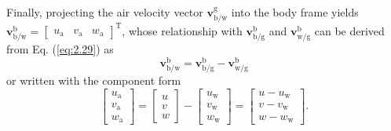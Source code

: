 Finally, projecting the air velocity vector $\mathbf{v}_{\text{{b}/{w}}}^{\text{g}}$
into the body frame yields $\mathbf{v}_{\text{{b}/{w}}}^{\text{b}}=\left[\begin{array}{ccc}
{u}_{\text{a}} & {v}_{\text{a}} & {w}_{\text{a}}\end{array}\right]^{\text{T}}$, whose relationship with $\mathbf{v}_{\text{{b}/{g}}}^{\text{b}}$
and $\mathbf{v}_{\text{{w}/{g}}}^{\text{b}}$ can be derived from
Eq. (\ref{eq:2.29}) as 
\begin{equation}
\mathbf{v}_{\text{{b}/{w}}}^{\text{b}}=\mathbf{v}_{\text{{b}/{g}}}^{\text{b}}-\mathbf{v}_{\text{{w}/{g}}}^{\text{b}}\label{eq:2.32}
\end{equation}
or written with the component form 
\begin{equation}
\left[{\begin{array}{c}
	{u_{\text{a}}}\\
	{v_{\text{a}}}\\
	{w_{\text{a}}}
	\end{array}}\right]=\left[\begin{array}{c}
u\\
v\\
w
\end{array}\right]-\left[{\begin{array}{c}
	{u_{\text{w}}}\\
	{v_{\text{w}}}\\
	{w_{\text{w}}}
	\end{array}}\right]=\left[{\begin{array}{c}
	{u-{u_{\text{w}}}}\\
	{v-{v_{\text{w}}}}\\
	{w-{w_{\text{w}}}}
	\end{array}}\right].\label{eq:2.33}
\end{equation}

